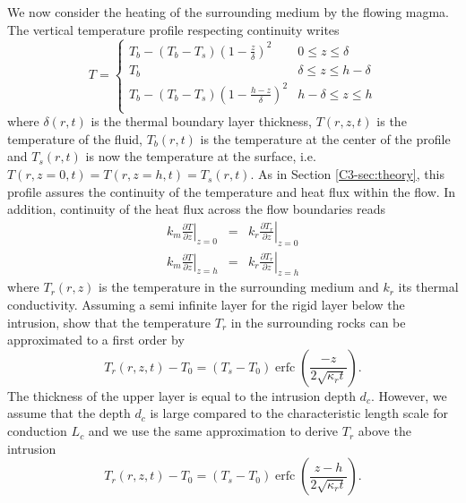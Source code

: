 We now consider  the heating of the surrounding medium  by the flowing
magma.  The vertical temperature profile respecting continuity writes
\begin{equation}
  T=
  \begin{cases}
    T_b - (T_b-T_s)(1-\frac{z}{\delta})^2 & 0 \le z\le \delta \\
    T_b & \delta \le z\le h-\delta \\
    T_b - (T_b-T_s)(1-\frac{h-z}{\delta})^2 & h-\delta \le z\le h\\
  \end{cases}
  \label{C4-Temperature}
\end{equation}
where  $\delta(r,t)$   is  the   thermal  boundary   layer  thickness,
$T(r,z,t)$  is  the  temperature  of  the  fluid,  $T_b(r,t)$  is  the
temperature at  the center of  the profile  and $T_s(r,t)$ is  now the
temperature  at the  surface, i.e.   $T(r,z=0,t)=T(r,z=h,t)=T_s(r,t)$.
As in Section \ref{C3-sec:theory}, this profile assures the continuity
of  the temperature  and  heat  flux within  the  flow.  In  addition,
continuity of the heat flux across the flow boundaries reads
\begin{eqnarray}
  k_m\left.\frac{\partial                                    T}{\partial
  z}\right|_{z=0}&=&k_r\left.\frac{\partial              T_r}{\partial
                     z}\right|_{z=0}  \label{C4-Flux1}\\
  k_m\left.\frac{\partial                                  T}{\partial
  z}\right|_{z=h}&=&k_r\left.\frac{\partial            T_r}{\partial
                     z}\right|_{z=h}
                     \label{C4-Flux2}
\end{eqnarray}
where  $T_r(r,z)$ is  the temperature  in the  surrounding medium  and
$k_r$ its  thermal conductivity.  Assuming  a semi infinite  layer for
the rigid layer below  the intrusion, \citet{Carslaw:1959wf} show that
the temperature $T_r$ in the  surrounding rocks can be approximated to
a first order by
\begin{equation}
  T_r(r,z,t)-T_0=(T_{s}-T_0)\operatorname{erfc}{\left(\frac{-z}{2\sqrt{\kappa_r t}}\right)}.
  \label{C4-eq22}
\end{equation}
The  thickness of  the upper  layer is  equal to  the intrusion  depth
$d_c$. However,  we assume that the  depth $d_c$ is large  compared to
the characteristic  length scale for  conduction $L_c$ and we  use the
same approximation to derive $T_r$ above the intrusion
\begin{equation}
  T_r(r,z,t)-T_0=(T_{s}-T_0)\operatorname{erfc}{\left(\frac{z-h}{2\sqrt{\kappa_r t}}\right)}.
  \label{C4-eq11}
\end{equation}
